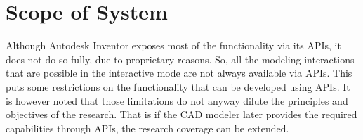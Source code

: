 

\section{Scope of System} \label{sec:proposal:scope}
Although Autodesk Inventor exposes most of the functionality via its APIs, it does not do so fully, due to proprietary reasons. So, all the modeling interactions that are possible in the interactive mode are not always available via APIs. This puts some restrictions on the functionality that can be developed using APIs.  It is however noted that those limitations do not anyway dilute the principles and objectives of the research. That is if the CAD modeler later provides the required capabilities through APIs, the research coverage can be extended.

